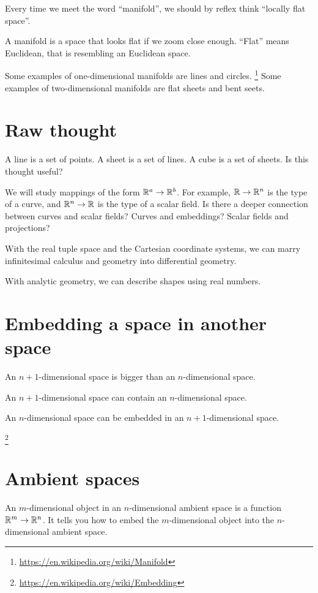 Every time we meet the word \enquote{manifold},
we should by reflex think \enquote{locally flat space}.

A manifold is a space that looks flat if we zoom close enough.
\enquote{Flat} means Euclidean, that is resembling an Euclidean space.


\ShowAnswers

Some examples of one-dimensional manifolds are lines and circles.%
\footnote{\url{https://en.wikipedia.org/wiki/Manifold}}
Some examples of two-dimensional manifolds are flat sheets and bent seets.

\section{Raw thought}

A line is a set of points.
A sheet is a set of lines.
A cube is a set of sheets.
Is this thought useful?

We will study mappings of the form \(\mathbb{R}^a \to \mathbb{R}^b\).
For example, \( \mathbb{R} \to \mathbb{R}^n \) is the type of a curve,
and \( \mathbb{R}^n \to \mathbb{R} \) is the type of a scalar field.
Is there a deeper connection between curves and scalar fields?
Curves and embeddings?
Scalar fields and projections?

With the real tuple space and the Cartesian coordinate systems,
we can marry infinitesimal calculus and geometry into differential geometry.

With analytic geometry, we can describe shapes using real numbers.

\section{Embedding a space in another space}

An \(n+1\)-dimensional space is bigger than an \(n\)-dimensional space.

An \(n+1\)-dimensional space can contain an \(n\)-dimensional space.

An \(n\)-dimensional space can be embedded in an \(n+1\)-dimensional space.

\footnote{\url{https://en.wikipedia.org/wiki/Embedding}}

\section*{Ambient spaces}

An \(m\)-dimensional object in an \(n\)-dimensional ambient space is a function \(\mathbb{R}^m \to \mathbb{R}^n\).
It tells you how to embed the \(m\)-dimensional object into the \(n\)-dimensional ambient space.

